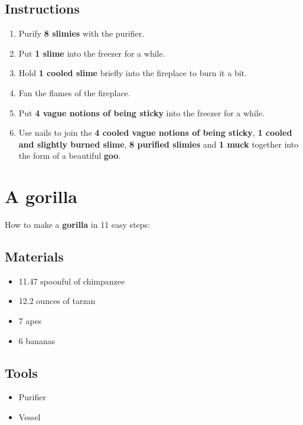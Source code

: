 \documentclass{article}
\begin{document}
\subsection{Instructions}\begin{enumerate}
\item 
Purify \textbf{8 slimies} with the purifier.
\item 
Put \textbf{1 slime} into the freezer for a while.
\item 
Hold \textbf{1 cooled slime} briefly into the fireplace to burn it a bit.
\item 
Fan the flames of the fireplace.
\item 
Put \textbf{4 vague notions of being sticky} into the freezer for a while.
\item 
Use nails to join the \textbf{4 cooled vague notions of being sticky}, \textbf{1 cooled and slightly burned slime}, \textbf{8 purified slimies} and \textbf{1 muck} together into the form of a beautiful \textbf{goo}.
\end{enumerate}
\newpage
\section{A gorilla}How to make a \textbf{gorilla} in 11 easy steps:

\subsection{Materials}\begin{itemize}
\item 
11.47 spoonful of chimpanzee
\item 
12.2 ounces of tarzan
\item 
7 apes
\item 
6 bananas
\end{itemize}
\subsection{Tools}\begin{itemize}
\item 
Purifier
\item 
Vessel
\end{itemize}
\end{document}
